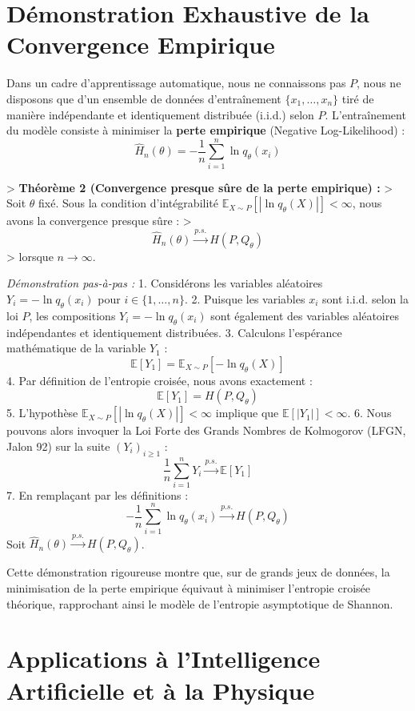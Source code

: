 \documentclass[11pt,a4paper]{article}
\begin{document}
\section{Démonstration Exhaustive de la Convergence Empirique}

Dans un cadre d'apprentissage automatique, nous ne connaissons pas $P$, nous ne disposons que d'un ensemble de données d'entraînement $\{x_1, \dots, x_n\}$ tiré de manière indépendante et identiquement distribuée (i.i.d.) selon $P$. L'entraînement du modèle consiste à minimiser la \textbf{perte empirique} (Negative Log-Likelihood) :
$$\hat{H}_n(\theta) = - \frac{1}{n} \sum_{i=1}^n \ln q_\theta(x_i)$$

> \textbf{Théorème 2 (Convergence presque sûre de la perte empirique) :}
> Soit $\theta$ fixé. Sous la condition d'intégrabilité $\mathbb{E}_{X \sim P}[|\ln q_\theta(X)|] < \infty$, nous avons la convergence presque sûre :
> $$\hat{H}_n(\theta) \xrightarrow{p.s.} H(P, Q_\theta)$$
> lorsque $n \to \infty$.

\textit{Démonstration pas-à-pas :}
1. Considérons les variables aléatoires $Y_i = - \ln q_\theta(x_i)$ pour $i \in \{1, \dots, n\}$.
2. Puisque les variables $x_i$ sont i.i.d. selon la loi $P$, les compositions $Y_i = -\ln q_\theta(x_i)$ sont également des variables aléatoires indépendantes et identiquement distribuées.
3. Calculons l'espérance mathématique de la variable $Y_1$ :
   $$\mathbb{E}[Y_1] = \mathbb{E}_{X \sim P}[-\ln q_\theta(X)]$$
4. Par définition de l'entropie croisée, nous avons exactement :
   $$\mathbb{E}[Y_1] = H(P, Q_\theta)$$
5. L'hypothèse $\mathbb{E}_{X \sim P}[|\ln q_\theta(X)|] < \infty$ implique que $\mathbb{E}[|Y_1|] < \infty$.
6. Nous pouvons alors invoquer la Loi Forte des Grands Nombres de Kolmogorov (LFGN, Jalon 92) sur la suite $(Y_i)_{i \ge 1}$ :
   $$\frac{1}{n} \sum_{i=1}^n Y_i \xrightarrow{p.s.} \mathbb{E}[Y_1]$$
7. En remplaçant par les définitions :
   $$- \frac{1}{n} \sum_{i=1}^n \ln q_\theta(x_i) \xrightarrow{p.s.} H(P, Q_\theta)$$
   Soit $\hat{H}_n(\theta) \xrightarrow{p.s.} H(P, Q_\theta)$.

Cette démonstration rigoureuse montre que, sur de grands jeux de données, la minimisation de la perte empirique équivaut à minimiser l'entropie croisée théorique, rapprochant ainsi le modèle de l'entropie asymptotique de Shannon.

\section{Applications à l'Intelligence Artificielle et à la Physique}
\end{document}
